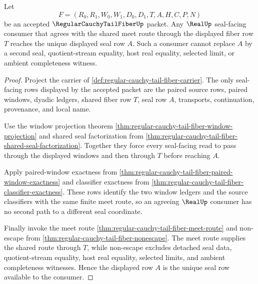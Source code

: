 \begin{theorem}
\label{thm:regular-cauchy-tail-fiber-real-seal-determinacy}
Let
$$
F=(R_0,R_1,W_0,W_1,D_0,D_1,T,A,H,C,P,N)
$$
be an accepted $\RegularCauchyTailFiberUp$ packet. Any $\RealUp$ seal-facing consumer that agrees with the shared meet route through the displayed fiber row $T$ reaches the unique displayed seal row $A$. Such a consumer cannot replace $A$ by a second seal, quotient-stream equality, host real equality, selected limit, or ambient completeness witness.
\end{theorem}
\begin{proof}
Project the carrier of \autoref{def:regular-cauchy-tail-fiber-carrier}. The only seal-facing rows displayed by the accepted packet are the paired source rows, paired windows, dyadic ledgers, shared fiber row $T$, seal row $A$, transports, continuation, provenance, and local name.

Use the window projection theorem \autoref{thm:regular-cauchy-tail-fiber-window-projection} and shared seal factorization from \autoref{thm:regular-cauchy-tail-fiber-shared-seal-factorization}. Together they force every seal-facing read to pass through the displayed windows and then through $T$ before reaching $A$.

Apply paired-window exactness from \autoref{thm:regular-cauchy-tail-fiber-paired-window-exactness} and classifier exactness from \autoref{thm:regular-cauchy-tail-fiber-classifier-exactness}. These rows identify the two window ledgers and the source classifiers with the same finite meet route, so an agreeing $\RealUp$ consumer has no second path to a different seal coordinate.

Finally invoke the meet route \autoref{thm:regular-cauchy-tail-fiber-meet-route} and non-escape from \autoref{thm:regular-cauchy-tail-fiber-nonescape}. The meet route supplies the shared route through $T$, while non-escape excludes detached seal data, quotient-stream equality, host real equality, selected limits, and ambient completeness witnesses. Hence the displayed row $A$ is the unique seal row available to the consumer.
\end{proof}

